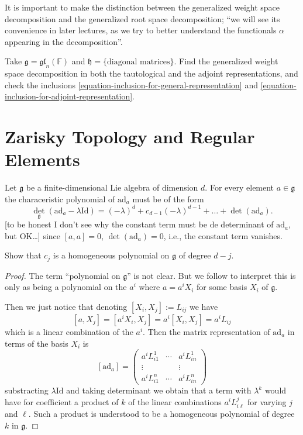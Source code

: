 It is important to make the distinction between the generalized weight
space decomposition and the generalized root space decomposition;
``we will see its convenience in later lectures, as 
we try to better understand the functionals $\alpha$ appearing
in the decomposition''.

\begin{exercise}
\label{exercise-generalized-weight-space-decomposition-for-gl}
Take $\mathfrak{g}=\mathfrak{gl}_n(\mathbb{F})$ and 
$\mathfrak{h}=\{\text{diagonal matrices}\}$.
Find the generalized weight space decomposition in both the 
tautological and the adjoint representations,
and check the inclusions \ref{equation-inclusion-for-general-representation} and
\ref{equation-inclusion-for-adjoint-representation}. 
\end{exercise}

\section{Zarisky Topology and Regular Elements}
\label{section-Zarisky-topology-and-regular-elements}

Let $\mathfrak{g}$ be a finite-dimensional Lie algebra
of dimension $d$. For every element  $a \in \mathfrak{g}$
the characeristic polynomial
of $\text{ad}_a$ must be of the form
$$
\det_{\mathfrak{g}}(\text{ad}_a-\lambda\text{Id})
=(-\lambda)^d+c_{d-1}(-\lambda)^{d-1}+\ldots
+\det(\text{ad}_a).
$$
[to be honest I don't see why the constant
term must be de determinant of $\text{ad}_a$, but OK…]
since $[a,a]=0$, $\det(\text{ad}_a)=0$, i.e., the
constant term vanishes.

\begin{exercise}
\label{exercise-characteristic-polynomial-of-ada}
Show that $c_j$ is a homogeneous polynomial on $\mathfrak{g}$ 
of degree $d-j$.
\end{exercise}

\begin{proof}
The term ``polynomial on $\mathfrak{g}$'' is not clear.
But we follow \cite{KLAL} to interpret this is only as
being a polynomial on the $a^i$ where $a=a^iX_i$
for some basis $X_i$ of $\mathfrak{g}$.

Then we just notice that denoting $[X_i,X_j]:=L_{ij}$ we have
$$
[a,X_j]=[a^iX_i,X_j]=a^i[X_i,X_j]=a^iL_{ij}
$$
which is a linear combination of the $a^i$. Then the matrix
representation of $\text{ad}_a$ in terms of the basis $X_i$ is
$$
[\text{ad}_a]=\begin{pmatrix}
a^iL_{i1}^1&\cdots &a^iL_{in}^1\\
\vdots &&\vdots \\
a^iL_{i 1}^n&  \cdots &  a^iL_{in}^n
\end{pmatrix}
$$
substracting $\lambda \text{Id}$ and taking determinant
we obtain that a term with $\lambda^k$ would have 
for coefficient a product of $k$ of the linear
combinations $a^iL_{i\ell}^j$ for varying $j$ and $\ell$.
Such a product is understood to be a homogeneous polynomial
of degree $k$ in $\mathfrak{g}$.
\end{proof}

